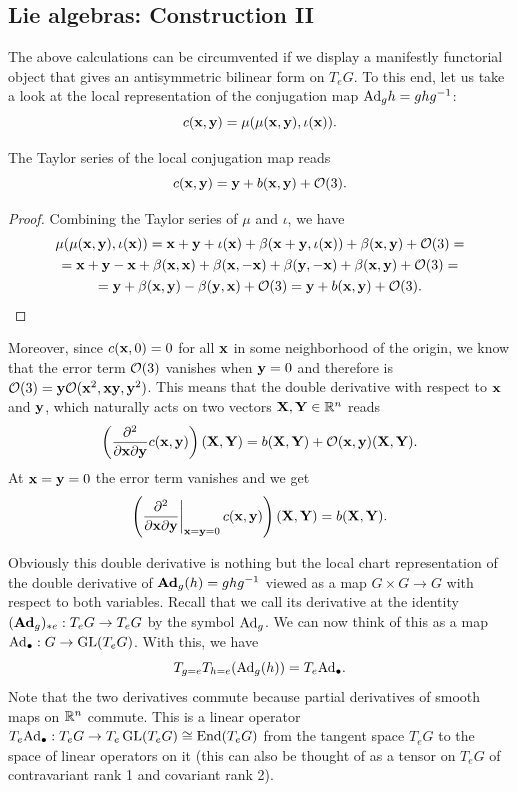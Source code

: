 \subsection{Lie algebras: Construction II}

The above calculations can be circumvented if we display a manifestly functorial object that gives an antisymmetric bilinear form on $T_eG$. To this end, let us take a look at the local representation of the conjugation map $\Ad_g h=ghg^{-1}$:
\[c(\bf{x},\bf{y})=\mu(\mu(\bf{x},\bf{y}),\iota(\bf{x})).\]

\begin{lem}
    The Taylor series of the local conjugation map reads
    \[c(\bf{x},\bf{y})=\bf{y}+b(\bf{x},\bf{y})+\calO(3).\]
\end{lem}
\begin{proof}
Combining the Taylor series of $\mu$ and $\iota$, we have
    \begin{multline}
        \mu(\mu(\bf{x},\bf{y}),\iota(\bf{x}))= \bf{x}+\bf{y}+\iota(\bf{x})+\beta(\bf{x}+\bf{y},\iota(\bf{x})) +\beta(\bf{x},\bf{y})+\calO(3)=\\
        =\bf{x}+\bf{y}-\bf{x}+\beta(\bf{x},\bf{x})+\beta(\bf{x},-\bf{x})+ \beta(\bf{y},-\bf{x})+ \beta(\bf{x},\bf{y})+\calO(3)=\\
        =\bf{y}+\beta(\bf{x},\bf{y})-\beta(\bf{y},\bf{x}) +\calO(3)=\bf{y}+b(\bf{x},\bf{y})+\calO(3).
    \end{multline}
\end{proof}

Moreover, since $c(\bf{x},0)=0$ for all $\bf{x}$ in some neighborhood of the origin, we know that the error term $\calO(3)$ vanishes when $\bf{y}=0$ and therefore is $\calO(3)=\bf{y}\calO(\bf{x}^2,\bf{x}\bf{y},\bf{y}^2)$. This means that the double derivative with respect to $\bf{x}$ and $\bf{y}$, which naturally acts on two vectors $\bf{X},\bf{Y}\in\bbR^n$ reads
\[\left(\frac{\partial^2}{\partial \bf{x}\partial \bf{y}}c(\bf{x},\bf{y})\right)(\bf{X},\bf{Y})=b(\bf{X},\bf{Y})+\calO(\bf{x},\bf{y})(\bf{X},\bf{Y}).\]
At $\bf{x}=\bf{y}=0$ the error term vanishes and we get
\[\left(\restr{\frac{\partial^2}{\partial \bf{x}\partial \bf{y}}}{\bf{x}=\bf{y}=0}c(\bf{x},\bf{y})\right)(\bf{X},\bf{Y})=b(\bf{X},\bf{Y}).\]

Obviously this double derivative is nothing but the local chart representation of the double derivative of $\Adg_g(h)= ghg^{-1}$ viewed as a map $G\times G\to G$ with respect to both variables. Recall that we call its derivative at the identity $(\Adg_g)_{\ast e}:T_eG\to T_e G$ by the symbol $\Ad_g$. We can now think of this as a map $\Ad_\bullet:G\to \GL(T_e G)$. With this, we have
\[T_{g=e}T_{h=e}(\Ad_g(h))=T_e \Ad_\bullet.\]
Note that the two derivatives commute because partial derivatives of smooth maps on $\bbR^n$ commute. This is a linear operator $T_e \Ad_\bullet:T_eG\to T_e\GL(T_e G)\cong \End(T_eG)$ from the tangent space $T_e G$ to the space of linear operators on it (this can also be thought of as a tensor on $T_e G$ of contravariant rank 1 and covariant rank 2). 

